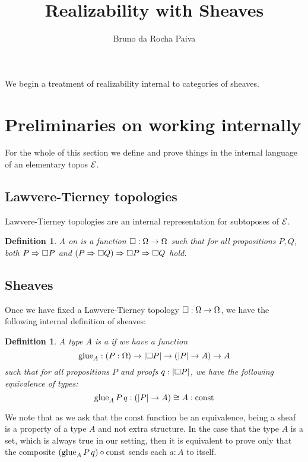 \documentclass[11pt]{article}
\newtheorem{defn}[thrm]{Definition}
\begin{document}
\title{Realizability with Sheaves}
\author{Bruno da Rocha Paiva}
\maketitle

We begin a treatment of realizability internal to categories of sheaves.

\section{Preliminaries on working internally}

For the whole of this section we define and prove things in the internal
language of an elementary topos \(\mathcal{E}\).

\subsection{Lawvere-Tierney topologies}%
\label{sub:lawvere-tierney-internal}

Lawvere-Tierney topologies are an internal representation for subtoposes
of \(\mathcal{E}\).

\begin{defn}\label{defn:lawvere-tierney}
  A  on is a function
  \(\Box : \Omega \to \Omega\) such that for all propositions \(P,Q\), both
  \({P}\Rightarrow{\Box{P}}\) and
  \({({P}\Rightarrow{\Box{Q}})}\Rightarrow{{\Box{P}}\Rightarrow{\Box{Q}}}\) hold.
\end{defn}

\subsection{Sheaves}%
\label{sub:sheaves-internal}

Once we have fixed a Lawvere-Tierney topology \(\Box : \Omega \to \Omega\),
we have the following internal definition of sheaves:

\begin{defn}
  A type \(A\) is a  if we have a function
  \[
    \text{glue}_{A} : (P : \Omega) \to |{\Box{P}}| \to (|{P}| \to A) \to A
  \]
  such that for all propositions \(P\) and proofs \(q : |{\Box{P}}|\),
  we have the following equivalence of types:
  \[
    \text{glue}_{A}\,P\,q : (|{P}| \to A) \cong A : \text{const}
  \]
\end{defn}

We note that as we ask that the \(\text{const}\) function be an equivalence,
being a sheaf is a property of a type \(A\) and not extra structure.
%
In the case that the type \(A\) is a set, which is always true in our setting,
then it is equivalent to prove only that the composite
\((\text{glue}_{A}\,P\,q) \circ \text{const}\) sends each \(a : A\) to itself.
\end{document}
